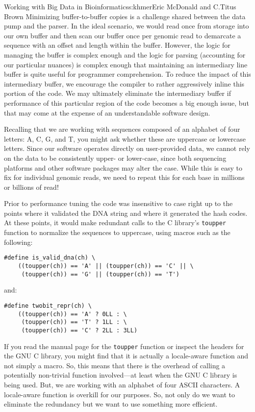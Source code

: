 \begin{aosachapter}{Working with Big Data in Bioinformatics}{s:khmer}{Eric McDonald and C.\/Titus Brown}
Minimizing buffer-to-buffer copies is a challenge shared between the
data pump and the parser. In the ideal scenario, we would read once from
storage into our own buffer and then scan our buffer once per genomic
read to demarcate a sequence with an offset and length within the
buffer. However, the logic for managing the buffer is complex enough and
the logic for parsing (accounting for our particular nuances) is complex
enough that maintaining an intermediary line buffer is quite useful for
programmer comprehension. To reduce the impact of this intermediary
buffer, we encourage the compiler to rather aggressively inline this
portion of the code. We may ultimately eliminate the intermediary buffer
if performance of this particular region of the code becomes a big
enough issue, but that may come at the expense of an understandable
software design.


Recalling that we are working with sequences composed of an alphabet of
four letters: A, C, G, and T, you might ask whether these are uppercase
or lowercase letters. Since our software operates directly on
user-provided data, we cannot rely on the data to be consistently upper-
or lower-case, since both sequencing platforms and other software
packages may alter the case. While this is easy to fix for individual
genomic reads, we need to repeat this for each base in millions or
billions of read!

Prior to performance tuning the code was insensitive to case right up to
the points where it validated the DNA string and where it generated the
hash codes. At these points, it would make redundant calls to the C
library's \texttt{toupper} function to normalize the sequences to
uppercase, using macros such as the following:

\begin{verbatim}
#define is_valid_dna(ch) \
    ((toupper(ch)) == 'A' || (toupper(ch)) == 'C' || \
     (toupper(ch)) == 'G' || (toupper(ch)) == 'T')
\end{verbatim}

\noindent and:

\begin{verbatim}
#define twobit_repr(ch) \
    ((toupper(ch)) == 'A' ? 0LL : \
     (toupper(ch)) == 'T' ? 1LL : \
     (toupper(ch)) == 'C' ? 2LL : 3LL)
\end{verbatim}

If you read the manual page for the \texttt{toupper} function or inspect
the headers for the GNU C library, you might find that it is actually a
locale-aware function and not simply a macro. So, this means that there
is the overhead of calling a potentially non-trivial function
involved---at least when the GNU C library is being used. But, we are
working with an alphabet of four ASCII characters. A locale-aware
function is overkill for our purposes. So, not only do we want to
eliminate the redundancy but we want to use something more efficient.


\end{aosachapter}

